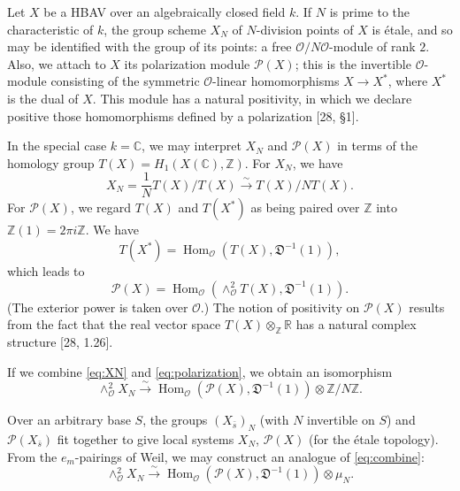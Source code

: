 \documentclass[12pt,a4paper]{article}
\theoremstyle{plain}
\theoremstyle{definition}
\DeclareMathOperator{\Hom}{Hom}
\newcommand{\OO}{\mathcal{O}}
\newcommand{\DD}{\mathfrak{D}}
\newcommand{\Z}{\mathbb{Z}}
\newcommand{\R}{\mathbb{R}}
\newcommand{\C}{\mathbb{C}}
\begin{document}
Let $X$ be a HBAV over an algebraically closed field $k$. If $N$ is prime to the characteristic of $k$, the group scheme $X_N$ of $N$-division points of $X$ is \'etale, and so may be identified with the group of its points: a free $\OO/N\OO$-module of rank $2$. Also, we attach to $X$ its polarization module $\mathscr{P}(X)$; this is the invertible $\OO$-module consisting of the symmetric $\OO$-linear homomorphisms $X\to X^*$, where $X^*$ is the dual of $X$. This module has a natural positivity, in which we declare positive those homomorphisms defined by a polarization [28, \S1].

In the special case $k=\C$, we may interpret $X_N$ and $\mathscr{P}(X)$ in terms of the homology group $T(X)=H_1(X(\C),\Z)$. For $X_N$, we have
\begin{equation}\label{eq:XN}
X_N=\frac{1}{N}T(X)/T(X)\xrightarrow{\sim}T(X)/NT(X).
\end{equation}
For $\mathscr{P}(X)$, we regard $T(X)$ and $T(X^*)$ as being paired over $\Z$ into $\Z(1)=2\pi i\Z$. We have
\[
T(X^*)=\Hom_{\OO}(T(X),\DD^{-1}(1)),
\]
which leads to
\begin{equation}\label{eq:polarization}
\mathscr{P}(X)=\Hom_{\OO}(\wedge^2_{\OO}T(X),\DD^{-1}(1)).
\end{equation}
(The exterior power is taken over $\OO$.) The notion of positivity on $\mathscr{P}(X)$ results from the fact that the real vector space $T(X)\otimes_{\Z}\R$ has a natural complex structure [28, 1.26].

If we combine \eqref{eq:XN} and \eqref{eq:polarization}, we obtain an isomorphism
\begin{equation}\label{eq:combine}
\wedge^2_{\OO}X_N\xrightarrow{\sim}\Hom_{\OO}(\mathscr{P}(X),\DD^{-1}(1))\otimes\Z/N\Z.
\end{equation}

Over an arbitrary base $S$, the groups $(X_{\bar{s}})_N$ (with $N$ invertible on $S$) and $\mathscr{P}(X_{\bar{s}})$ fit together to give local systems $X_N$, $\mathscr{P}(X)$ (for the \'etale topology). From the $e_m$-pairings of Weil, we may construct an analogue of \eqref{eq:combine}:
\begin{equation}\label{eq:weil}
\wedge^2_{\OO}X_N\xrightarrow{\sim}\Hom_{\OO}(\mathscr{P}(X),\DD^{-1}(1))\otimes\mu_N.
\end{equation}
\end{document}
